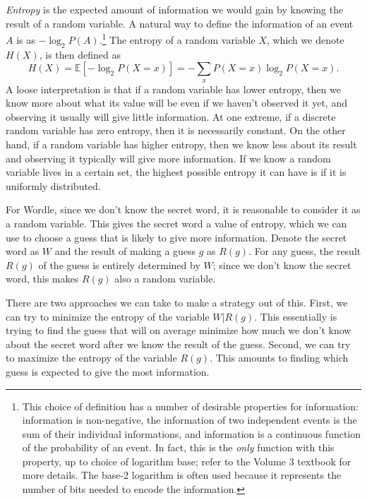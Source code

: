 \emph{Entropy} is the expected amount of information we would gain by knowing the result of a random variable.
A natural way to define the information of an event \(A\) is as \(-\log_2 P(A)\).\footnote{This choice of definition has a number of desirable properties for information: information is non-negative, the information of two independent events is the sum of their individual informations, and information is a continuous function of the probability of an event.
In fact, this is the \emph{only} function with this property, up to choice of logarithm base; refer to the Volume 3 textbook for more details.
The base-2 logarithm is often used because it represents the number of bits needed to encode the information.}
The entropy of a random variable \(X\), which we denote \(H(X)\), is then defined as
\[
H(X)= \mathbb{E}\left[-\log_2 P(X=x)\right]=-\sum_x P(X=x)\log_2 P(X=x).
\]
A loose interpretation is that if a random variable has lower entropy, then we know more about what its value will be even if we haven't observed it yet, and observing it usually will give little information.
At one extreme, if a discrete random variable has zero entropy, then it is necessarily constant.%
On the other hand, if a random variable has higher entropy, then we know less about its result and observing it typically will give more information.
If we know a random variable lives in a certain set, the highest possible entropy it can have is if it is uniformly distributed.

For Wordle, since we don't know the secret word, it is reasonable to consider it as a random variable.
This gives the secret word a value of entropy, which we can use to choose a guess that is likely to give more information.
Denote the secret word as \(W\) and the result of making a guess \(g\) as \(R(g)\).
For any guess, the result $R(g)$ of the guess is entirely determined by $W$; since we don't know the secret word, this makes $R(g)$ also a random variable.

There are two approaches we can take to make a strategy out of this.
First, we can try to minimize the entropy of the variable \(W|R(g)\).
This essentially is trying to find the guess that will on average minimize how much we don't know about the secret word after we know the result of the guess.
Second, we can try to maximize the entropy of the variable \(R(g)\).
This amounts to finding which guess is expected to give the most information.


